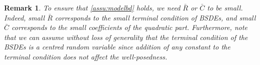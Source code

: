 \documentclass[10pt,a4paper]{article}
\newcommand{\be}{\begin{equation}}
\newcommand{\ee}{\end{equation}}
\newcommand{\bC}{\bar{C}}
\newcommand{\bR}{\bar{R}}
\newcommand{\Balpha}{\boldsymbol{\alpha}}
\newcommand{\hBalpha}{\hat{\Balpha}}
\theoremstyle{plain}
\newtheorem{Remark}[Theorem]{Remark}
\theoremstyle{definition}
\numberwithin{equation}{section}
\newcommand{\lps}[2]{{}^{#1}\!#2}
\begin{document}
\begin{Remark}
\label{Rem3.5}
To ensure that \eqref{assu:modelbd} holds, we need $\bR$ or $\bC$ to be small. Indeed, small $\bR$ corresponds to the small terminal condition of BSDEs, and small $\bC$ corresponds to the small coefficients of the quadratic part. Furthermore, note that we can assume without loss of generality that the terminal condition of the BSDEs is a centred random variable since addition of any constant to the terminal condition does not affect the well-posedness.
 
\end{Remark}



\end{document}
